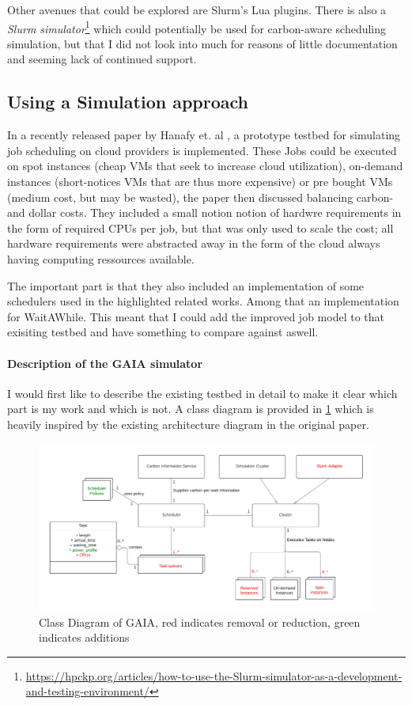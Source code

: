 Other avenues that could be explored are Slurm's Lua plugins. There is also a \emph{Slurm simulator}\footnote{\url{https://hpckp.org/articles/how-to-use-the-Slurm-simulator-as-a-development-and-testing-environment/}} which could potentially be used for carbon-aware scheduling simulation, but that I did not look into much for reasons of little documentation and seeming lack of continued support.

\subsection{Using a Simulation approach}

In a recently released paper by Hanafy et. al \cite{hanafy_going_2024}, a prototype testbed for simulating job scheduling on cloud providers is implemented. 
These Jobs could be executed on spot instances (cheap VMs that seek to increase cloud utilization), on-demand instances (short-notices VMs that are thus more expensive) or pre bought VMs (medium cost, but may be wasted), the paper then discussed balancing carbon- and dollar costs. 
They included a small notion notion of hardwre requirements in the form of required CPUs per job, but that was only used to scale the cost; all hardware requirements were abstracted away in the form of the cloud always having computing ressources available.

The important part is that they also included an implementation of some schedulers used in the highlighted related works. Among that an implementation for WaitAWhile\cite{wiesner_lets_2021}.
This meant that I could add the improved job model to that exisiting testbed and have something to compare against aswell.

\paragraph{Description of the GAIA simulator}

I would first like to describe the existing testbed in detail to make it clear which part is my work and which is not. A class diagram is provided in \ref{fig:class_diagram} which is heavily inspired by the existing architecture diagram in the original paper. 

\begin{figure}
    \includegraphics[width=\linewidth]{images/MA Thesis Diagram.pdf}
    \caption{Class Diagram of GAIA, red indicates removal or reduction, green indicates additions}
    \label{fig:class_diagram}
\end{figure}

